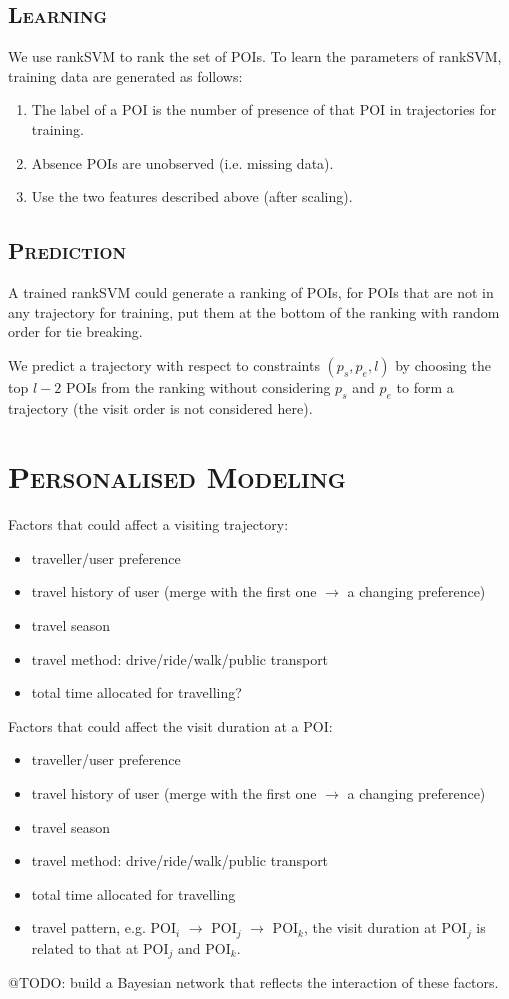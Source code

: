 \documentclass[11pt, a4paper]{article}
\begin{document}
\subsection{\textsc{Learning}}
We use rankSVM\cite{herbrich99} to rank the set of POIs.
To learn the parameters of rankSVM,
training data are generated as follows:
\begin{enumerate}
\item The label of a POI is the number of presence of that POI in trajectories for training.
\item Absence POIs are unobserved (i.e. missing data).
\item Use the two features described above (after scaling).
\end{enumerate}

\subsection{\textsc{Prediction}}
A trained rankSVM could generate a ranking of POIs,
for POIs that are not in any trajectory for training, 
put them at the bottom of the ranking with random order for tie breaking.

We predict a trajectory with respect to constraints
$(p_s, p_e, l)$ by choosing the top $l-2$ POIs from the ranking without considering 
$p_s$ and $p_e$ to form a trajectory (the visit order is not considered here).


\section{\textsc{Personalised Modeling}}
Factors that could affect a visiting trajectory:
\begin{itemize}
\item traveller/user preference
\item travel history of user (merge with the first one $\to$ a changing preference)
\item travel season
\item travel method: drive/ride/walk/public transport
\item total time allocated for travelling?
\end{itemize}
Factors that could affect the visit duration at a POI:
\begin{itemize}
\item traveller/user preference
\item travel history of user (merge with the first one $\to$ a changing preference)
\item travel season
\item travel method: drive/ride/walk/public transport
\item total time allocated for travelling
\item travel pattern, e.g. POI$_i$ $\to$ POI$_j$ $\to$ POI$_k$, 
      the visit duration at POI$_j$ is related to that at POI$_j$ and POI$_k$.
\end{itemize}
@TODO: build a Bayesian network that reflects the interaction of these factors.
\end{document}
